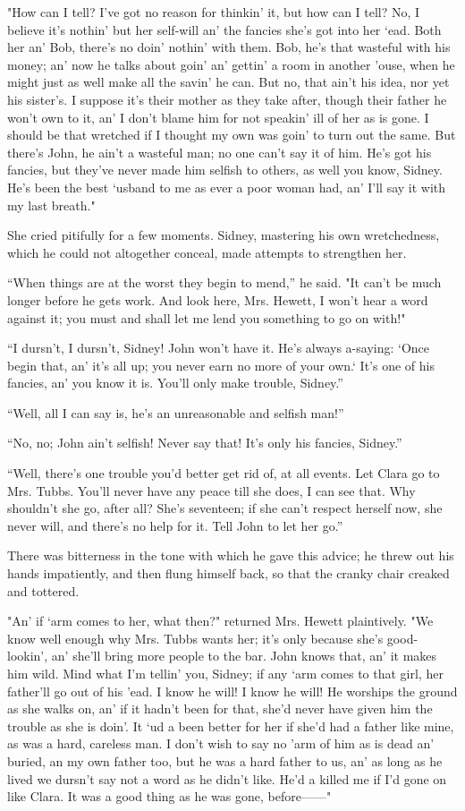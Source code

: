 "How can I tell? I've got no reason for thinkin' it, but how can I tell?
No, I believe it's nothin' but her self-will an' the fancies she's got
into her `ead. Both her an' Bob, there's no doin' nothin' with them.
{}Bob, he's that wasteful with his money; an' now he talks about goin'
an' gettin' a room in another 'ouse, when he might just as well make all
the savin' he can. But no, that ain't his idea, nor yet his sister's. I
suppose it's their mother as they take after, though their father he
won't own to it, an' I don't blame him for not speakin' ill of her as is
gone. I should be that wretched if I thought my own was goin' to turn
out the same. But there's John, he ain't a wasteful man; no one can't
say it of him. He's got his fancies, but they've never made him selfish
to others, as well you know, Sidney. He's been the best `usband to me as
ever a poor woman had, an' I'll say it with my last breath."

She cried pitifully for a few moments. Sidney, mastering his own
wretchedness, which he could not altogether conceal, made attempts to
strengthen her.

``When things are at the worst they begin to mend,'' he said. "It can't
be much longer before he gets work. And look here, Mrs. Hewett, I won't
hear a word against it; you {}must and shall let me lend you something
to go on with!"

``I dursn't, I dursn't, Sidney! John won't have it. He's always
a-saying: `Once begin that, an' it's all up; you never earn no more of
your own.` It's one of his fancies, an' you know it is. You'll only make
trouble, Sidney.''

``Well, all I can say is, he's an unreasonable and selfish man!''

``No, no; John ain't selfish! Never say that! It's only his fancies,
Sidney.''

``Well, there's one trouble you'd better get rid of, at all events. Let
Clara go to Mrs. Tubbs. You'll never have any peace till she does, I can
see that. Why shouldn't she go, after all? She's seventeen; if she can't
respect herself now, she never will, and there's no help for it. Tell
John to let her go.''

There was bitterness in the tone with which he gave this advice; he
threw out his hands impatiently, and then flung himself back, so that
the cranky chair creaked and tottered.

{}"An' if `arm comes to her, what then?" returned Mrs. Hewett
plaintively. "We know well enough why Mrs. Tubbs wants her; it's only
because she's good-lookin', an' she'll bring more people to the bar.
John knows that, an' it makes him wild. Mind what I'm tellin' you,
Sidney; if any `arm comes to that girl, her father'll go out of his
'ead. I know he will! I know he will! He worships the ground as she
walks on, an' if it hadn't been for that, she'd never have given him the
trouble as she is doin'. It `ud a been better for her if she'd had a
father like mine, as was a hard, careless man. I don't wish to say no
'arm of him as is dead an' buried, an my own father too, but he was a
hard father to us, an' as long as he lived we dursn't say not a word as
he didn't like. He'd a killed me if I'd gone on like Clara. It was a
good thing as he was gone, before{{------}}"

